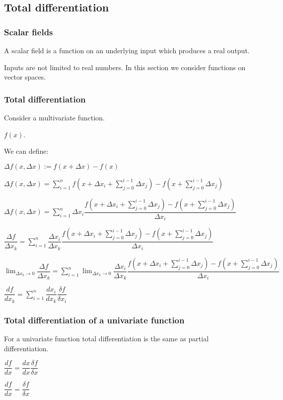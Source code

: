 
\subsection{Total differentiation}

\subsubsection{Scalar fields}

A scalar field is a function on an underlying input which produces a real output.

Inputs are not limited to real numbers. In this section we consider functions on vector spaces.

\subsubsection{Total differentiation}

Consider a multivariate function.

\(f(x)\).

We can define:

\(\Delta f(x, \Delta x):=f(x+\Delta x)-f(x)\)

\(\Delta f(x, \Delta x)=\sum_{i=1}^nf(x+\Delta x_i+\sum_{j=0}^{i-1}\Delta x_j)-f(x+\sum_{j=0}^{i-1}\Delta x_j)\)

\(\Delta f(x, \Delta x)=\sum_{i=1}^n\Delta x_i \dfrac{f(x+\Delta x_i+\sum_{j=0}^{i-1}\Delta x_j)-f(x+\sum_{j=0}^{i-1}\Delta x_j)}{\Delta x_i}\)

\(\dfrac{\Delta f}{\Delta x_k}=\sum_{i=1}^n\dfrac{\Delta x_i}{\Delta x_k} \dfrac{f(x+\Delta x_i+\sum_{j=0}^{i-1}\Delta x_j)-f(x+\sum_{j=0}^{i-1}\Delta x_j)}{\Delta x_i}\)

\(\lim_{\Delta x_k \rightarrow 0}\dfrac{\Delta f}{\Delta x_k}=\sum_{i=1}^n\lim_{\Delta x_k \rightarrow 0}\dfrac{\Delta x_i}{\Delta x_k} \dfrac{f(x+\Delta x_i+\sum_{j=0}^{i-1}\Delta x_j)-f(x+\sum_{j=0}^{i-1}\Delta x_j)}{\Delta x_i}\)

\(\dfrac{df}{dx_k}=\sum_{i=1}^n\dfrac{dx_i}{dx_k} \dfrac{\delta f}{\delta x_i}\)

\subsubsection{Total differentiation of a univariate function}

For a univariate function total differentiation is the same as partial differentiation.

\(\dfrac{df}{dx}=\dfrac{dx}{dx} \dfrac{\delta f}{\delta x}\)

\(\dfrac{df}{dx}=\dfrac{\delta f}{\delta x}\)

